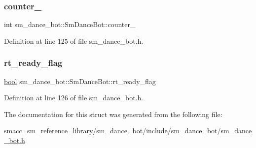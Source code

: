\subsubsection{\texorpdfstring{counter\+\_}{counter\_1}}
{\footnotesize\ttfamily int sm\+\_\+dance\+\_\+bot\+::\+Sm\+Dance\+Bot\+::counter\+\_}



Definition at line 125 of file sm\+\_\+dance\+\_\+bot.\+h.

\mbox{\label{structsm__dance__bot_1_1SmDanceBot_a0f0587a13670ad8925555cd8f6cb6b2d}} 
\subsubsection{\texorpdfstring{rt\+\_\+ready\+\_\+flag}{rt\_ready\_flag}}
{\footnotesize\ttfamily \hyperlink{classbool}{bool} sm\+\_\+dance\+\_\+bot\+::\+Sm\+Dance\+Bot\+::rt\+\_\+ready\+\_\+flag}



Definition at line 126 of file sm\+\_\+dance\+\_\+bot.\+h.



The documentation for this struct was generated from the following file\+:\begin{DoxyCompactItemize}
\item 
smacc\+\_\+sm\+\_\+reference\+\_\+library/sm\+\_\+dance\+\_\+bot/include/sm\+\_\+dance\+\_\+bot/\hyperlink{sm__dance__bot_8h}{sm\+\_\+dance\+\_\+bot.\+h}\end{DoxyCompactItemize}
